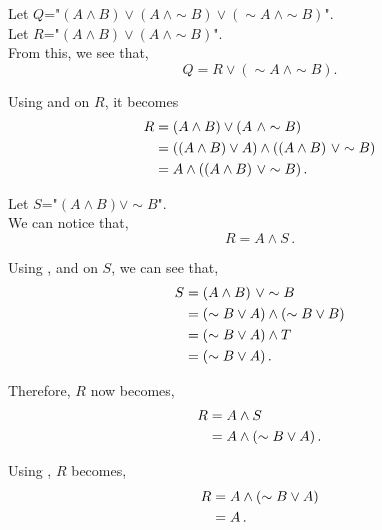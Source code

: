 \begin{subquestions}
\begin{subsubquestions}
\end{subsubquestions}


\subquestion

Let $Q$="$(A \land B) \lor (A ~\land \sim B) \lor (\sim A ~\land \sim B)$". \\

Let $R$="$(A \land B) \lor (A ~\land \sim B)$". \\

From this, we see that,
\begin{equation}
	Q = R \lor (\sim A ~\land \sim B). \label{2008:q2:BooleanMainEqn}
\end{equation}

Using  and  on $R$, it becomes
\begin{align}
	R & = (A \land B) \lor (A ~\land \sim B) \nonumber \\
	  & = ((A \land B) \lor A) \land ((A \land B) ~\lor \sim B) \nonumber \\
	  & = A \land ((A \land B) ~\lor \sim B) \,.
\end{align}

Let $S$="$(A \land B) \lor \sim B$". \\

We can notice that,
\begin{equation}
	R = A \land S \,.
\end{equation}

Using ,  and  on $S$, we can see that,
\begin{align}
	S & = (A \land B) ~\lor \sim B \nonumber \\
	  & = (\sim B \lor A) \land (\sim B \lor B) \nonumber \\
	  & = (\sim B \lor A) \land T \nonumber \\
	  & = (\sim B \lor A) \,.
\end{align}

Therefore, $R$ now becomes,
\begin{align}
	R & = A \land S \nonumber \\
	  & = A \land (\sim B \lor A) \,.
\end{align}

Using , $R$ becomes,
\begin{align}
	R & = A \land (\sim B \lor A) \nonumber \\
	  & = A \,.
\end{align}


\end{subquestions}
